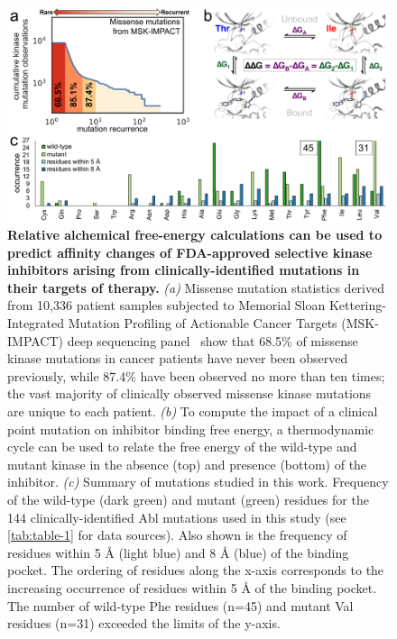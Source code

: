 \documentclass[phd,tocprelim]{cornell}
\renewcommand{\TABLE}[1]{\autoref{tab:#1}}
\begin{document}
\begin{landscape}
	\begin{figure}[p]
		\centering
		\includegraphics[width=0.8\linewidth]{figures/abl-figure-1.pdf}
		\caption[Relative alchemical free-energy calculations can be used to predict affinity changes of FDA-approved selective kinase inhibitors arising from clinically-identified mutations in their targets of therapy.]{
			{\bf Relative alchemical free-energy calculations can be used to predict affinity changes of FDA-approved selective kinase inhibitors arising from clinically-identified mutations in their targets of therapy.}
			\emph{(a)}
			Missense mutation statistics derived from 10,336 patient samples subjected to Memorial Sloan
			Kettering-Integrated Mutation Profiling of Actionable Cancer Targets (MSK-IMPACT) deep sequencing panel~\citep{Zehir:Nat.Med.:2017} show that 68.5\% of missense kinase mutations in cancer patients have never been observed previously, while 87.4\% have been observed no more than ten times; the vast majority of clinically observed missense kinase mutations are unique to each patient.
			\emph{(b)} To compute the impact of a clinical point mutation on inhibitor binding free energy, a thermodynamic cycle can be used to relate the free energy of the wild-type and mutant kinase in the absence (top) and presence (bottom) of the inhibitor.
			\emph{(c)} Summary of mutations studied in this work. 
			Frequency of the wild-type (dark green) and mutant (green) residues for the 144 clinically-identified Abl mutations used in this study (see \TABLE{table-1} for data sources). 
			Also shown is the frequency of residues within 5 {\AA} (light blue) and 8 {\AA} (blue) of the binding pocket. 
			The ordering of residues along the x-axis corresponds to the increasing occurrence of residues within 5 {\AA} of the binding pocket.
			The number of wild-type Phe residues (n=45) and mutant Val residues (n=31) exceeded the limits of the y-axis.
		}
		\label{fig:abl-figure1}
	\end{figure}
\end{landscape}
\end{document}
